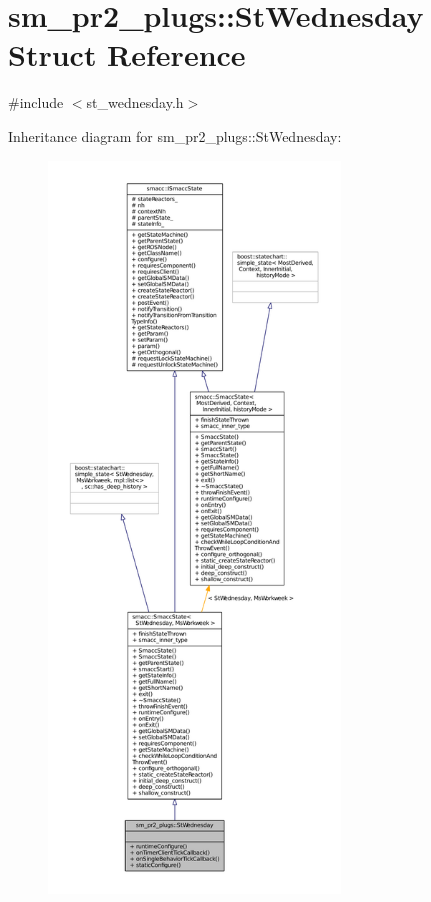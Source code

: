 \hypertarget{structsm__pr2__plugs_1_1StWednesday}{}\section{sm\+\_\+pr2\+\_\+plugs\+:\+:St\+Wednesday Struct Reference}
\label{structsm__pr2__plugs_1_1StWednesday}


{\ttfamily \#include $<$st\+\_\+wednesday.\+h$>$}



Inheritance diagram for sm\+\_\+pr2\+\_\+plugs\+:\+:St\+Wednesday\+:
\nopagebreak
\begin{figure}[H]
\begin{center}
\leavevmode
\includegraphics[height=550pt]{structsm__pr2__plugs_1_1StWednesday__inherit__graph}
\end{center}
\end{figure}


